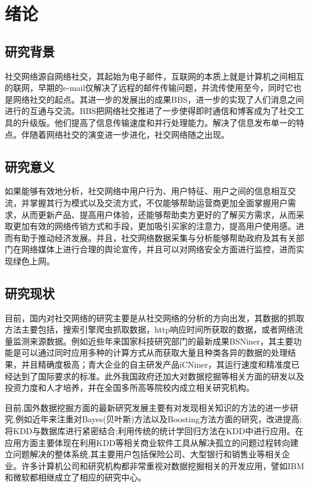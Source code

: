 \chapter{绪论}
\section{研究背景}
社交网络源自网络社交，其起始为电子邮件，互联网的本质上就是计算机之间相互的联网，早期的e-mail仅解决了远程的邮件传输问题，并流传使用至今，同时它也是网络社交的起点。其进一步的发展出的成果BBS，进一步的实现了人们消息之间进行的互通与交流。BBS把网络社交推进了一步使得即时通信和博客成为了社交工具的升级版。他们提高了信息传输速度和并行处理能力。解决了信息发布单一的特点。伴随着网络社交的演变进一步进化，社交网络随之出现。

\section{研究意义}
如果能够有效地分析，社交网络中用户行为、用户特征、用户之间的信息相互交流，并掌握其行为模式以及交流方式，不仅能够帮助运营商更加全面掌握用户需求，从而更新产品、提高用户体验，还能够帮助卖方更好的了解买方需求，从而采取更加有效的网络传销方式和手段，更加吸引买家的注意力，提高用户使用感。进而有助于推动经济发展。并且，社交网络数据采集与分析能够帮助政府及其有关部门在网络媒体上进行合理的舆论宣传，并且可以对网络安全方面进行监控，进而实现绿色上网。

\section{研究现状}

目前，国内对社交网络的研究主要是从社交网络的分析的方向出发，其数据的抓取方法主要包括，搜索引擎爬虫抓取数据，http响应时间所获取的数据，或者网络流量监测来源数据。例如近些年来国家科技研究部门的最新成果BSNiner，其主要功能是可以通过同时应用多种的计算方式从而获取大量且种类各异的数据的处理结果，并且精确度极高；青大企业的自主研发产品iCNiner，其运行速度和精准度已经达到了国际要求的标准。此外我国政府还加大对数据挖掘等相关方面的研发以及投资力度和人才培养，并在全国多所高等院校内成立相关研究机构。
\par
目前,国外数据挖掘方面的最新研究发展主要有对发现相关知识的方法的进一步研究,例如近年来注重对Bayes(贝叶斯)方法以及Boosting方法方面的研究，改进提高;将KDD与数据库进行紧密结合;利用传统的统计学回归方法在KDD中进行应用。在应用方面主要体现在利用KDD等相关商业软件工具从解决孤立的问题过程转向建立问题解决的整体系统,其主要用户包括保险公司、大型银行和销售业等相关企业。许多计算机公司和研究机构都非常重视对数据挖掘相关的开发应用，譬如IBM和微软都相继成立了相应的研究中心。


